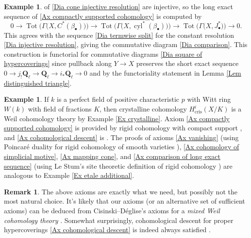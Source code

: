 \documentclass[11pt]{amsart}
\theoremstyle{definition}
\newtheorem{Rmk}[Thm]{Remark}
\newtheorem{Ex}[Thm]{Example}
\newcommand{\Q}{\mathbf Q}
\newcommand{\Tot}{\operatorname{Tot}}
\newcommand{\cyl}{\operatorname{cyl}}
\begin{document}
\begin{Ex}
of \eqref{Dia cone injective resolution} are injective, so the long
exact sequence of \ref{Ax compactly supported cohomology} is
computed by
\[
0 \to \Tot\Big(\Gamma\big(X,C^*(\beta_\bullet)\big)\Big) \to
\Tot\Big(\Gamma\big(X,\cyl^*(\beta_\bullet)\big)\Big) \to
\Tot\Big(\Gamma\big(X,J^*_\bullet\big)\Big) \to 0.
\]
This agrees with the sequence \eqref{Dia termwise split} for the
constant resolution \eqref{Dia injective resolution}, giving the
commutative diagram \eqref{Dia comparison}.
%
This construction is functorial for commutative diagrams \eqref{Dia
square of hypercoverings} since pullback along $Y \to X$ preserves
the short exact sequence $0 \to j_!\Q_\ell \to \Q_\ell \to
i_*\Q_\ell \to 0$ and by the functoriality statement in Lemma
\ref{Lem distinguished triangle}.
\end{Ex}

\begin{Ex}\label{Ex crystalline additional}
If $k$ is a perfect field of positive characteristic $p$ with Witt
ring $W(k)$ with field of fractions $K$, then crystalline cohomology
$H^i_{\text{cris}}(X/K)$ is a Weil cohomology theory by Example
\ref{Ex crystalline}. Axiom \ref{Ax compactly supported cohomology}
is provided by rigid cohomology with compact support
\cite[3.1(iii)]{BerRig}, and \ref{Ax cohomological descent} is
\cite[Theorem~4.5.1]{Tsu}. The proofs of axioms \ref{Ax vanishing}
(using Poincar\'e duality for rigid cohomology of smooth varieties
\cite{BerDual}), \ref{Ax cohomology of simplicial motive}, \ref{Ax
mapping cone}, and \ref{Ax comparison of long exact sequence} (using
Le Stum's site theoretic definition of rigid cohomology
\cite{LeStum}) are analogous to Example \ref{Ex etale additional}.
\end{Ex}

\begin{Rmk}\label{Rmk Cisinski-Deglise}
The above axioms are exactly what we need, but possibly not the most
natural choice. It's likely that our axioms (or an alternative set
of sufficient axioms) can be deduced from Cisinski--D\'eglise's
axioms for a \emph{mixed Weil cohomology theory} \cite{CisDeg1}.
Somewhat surprisingly, cohomological descent for proper
hypercoverings \ref{Ax cohomological descent} is indeed always
satisfied \cite[Corollary~17.2.6]{CisDeg2}.
\end{Rmk}
\end{document}

